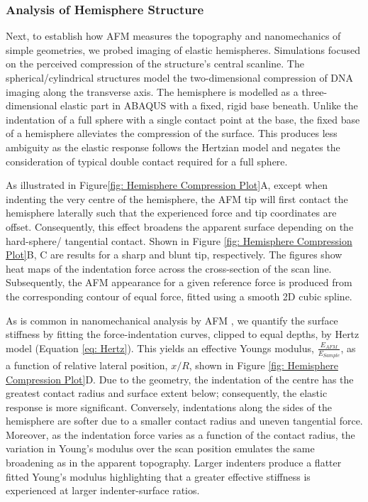 \subsubsection{Analysis of Hemisphere Structure}
Next, to establish how AFM measures the topography and nanomechanics of simple geometries, we probed imaging of elastic hemispheres. Simulations focused on the perceived compression of the structure's central scanline. The spherical/cylindrical structures model the two-dimensional compression of DNA imaging along the transverse axis\cite{sotres2010afm,li2014atomic}. The hemisphere is modelled as a three-dimensional elastic part in ABAQUS with a fixed, rigid base beneath. Unlike the indentation of a full sphere with a single contact point at the base, the fixed base of a hemisphere alleviates the compression of the surface. This produces less ambiguity as the elastic response follows the Hertzian model and negates the consideration of typical double contact required for a full sphere. 

As illustrated in Figure\ref{fig: Hemisphere Compression Plot}A, except when indenting the very centre of the hemisphere, the AFM tip will first contact the hemisphere laterally such that the experienced force and tip coordinates are offset. Consequently, this effect broadens the apparent surface depending on the hard-sphere/ tangential contact. Shown in Figure \ref{fig: Hemisphere Compression Plot}B, C are results for a sharp and blunt tip, respectively. The figures show heat maps of the indentation force across the cross-section of the scan line. Subsequently, the AFM appearance for a given reference force is produced from the corresponding contour of equal force, fitted using a smooth 2D cubic spline. 

As is common in nanomechanical analysis by AFM \cite{sun2021determination,DIMITRIADIS20022798,kontomaris2019determination}, we quantify the surface stiffness by fitting the force-indentation curves, clipped to equal depths, by Hertz model (Equation \ref{eq: Hertz}). This yields an effective Youngs modulus, $\frac{E_{AFM}}{E_{Sample}}$, as a function of relative lateral position, $x/R$, shown in Figure \ref{fig: Hemisphere Compression Plot}D. Due to the geometry, the indentation of the centre has the greatest contact radius and surface extent below; consequently, the elastic response is more significant. Conversely, indentations along the sides of the hemisphere are softer due to a smaller contact radius and uneven tangential force. Moreover, as the indentation force varies as a function of the contact radius, the variation in Young's modulus over the scan position emulates the same broadening as in the apparent topography. Larger indenters produce a flatter fitted Young's modulus highlighting that a greater effective stiffness is experienced at larger indenter-surface ratios.

